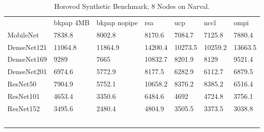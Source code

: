 \begin{table}
    \centering
    \caption{Horovod Synthetic Benchmark, 8 Nodes on Narval.}
    \begin{tabular}{lllllll}
                & bkpap 4MB & bkpap nopipe & rsa     & ucp     & nccl    & ompi    \\
    MobileNet   & 7838.8    & 8002.8       & 8170.6  & 7084.7  & 7125.8  & 7880.4  \\
    DenseNet121 & 11064.8   & 11864.9      & 14200.4 & 10273.5 & 10259.2 & 13663.5 \\
    DenseNet169 & 9289      & 7665         & 10832.7 & 8201.9  & 8129    & 9521.4  \\
    DenseNet201 & 6974.6    & 5772.9       & 8177.5  & 6282.9  & 6112.7  & 6879.5  \\
    ResNet50    & 7904.9    & 5752.1       & 10658.2 & 8376.2  & 8385.2  & 6516.4  \\
    ResNet101   & 4653.4    & 3350.6       & 6484.6  & 4692    & 4724.8  & 3756.1  \\
    ResNet152   & 3495.6    & 2480.4       & 4804.9  & 3505.5  & 3373.5  & 3038.8  \\
    ~           & ~         & ~            & ~       & ~       & ~       & ~       \\
    \end{tabular}
    \label{tbl:ng_hvd_synth_8n}
\end{table}